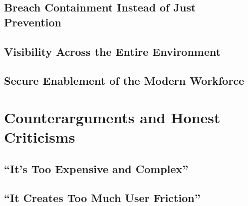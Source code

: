 \documentclass[12pt, letterpaper]{article}
\begin{document}
\subsection{Breach Containment Instead of Just Prevention}

\subsection{Visibility Across the Entire Environment}

\subsection{Secure Enablement of the Modern Workforce}

\section{Counterarguments and Honest Criticisms}

\subsection{``It's Too Expensive and Complex''}

\subsection{``It Creates Too Much User Friction''}
\end{document}
